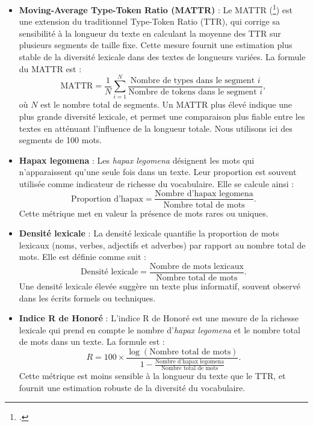 \documentclass[12pt,a4paper,oneside,titlepage]{book} %
\begin{document}
\begin{itemize}
\item \textbf{Moving-Average Type-Token Ratio (MATTR)} : Le MATTR (\footcite{covington2010cutting}) est une extension du traditionnel Type-Token Ratio (TTR), qui corrige sa sensibilité à la longueur du texte en calculant la moyenne des TTR sur plusieurs segments de taille fixe. Cette mesure fournit une estimation plus stable de la diversité lexicale dans des textes de longueurs variées. La formule du MATTR est :
\[
\text{MATTR} = \frac{1}{N} \sum_{i=1}^{N} \frac{\text{Nombre de types dans le segment } i}{\text{Nombre de tokens dans le segment } i},
\]
où \(N\) est le nombre total de segments. Un MATTR plus élevé indique une plus grande diversité lexicale, et permet une comparaison plus fiable entre les textes en atténuant l’influence de la longueur totale. Nous utilisons ici des segments de 100 mots.

\item \textbf{Hapax legomena} : Les \textit{hapax legomena} désignent les mots qui n’apparaissent qu’une seule fois dans un texte. Leur proportion est souvent utilisée comme indicateur de richesse du vocabulaire. Elle se calcule ainsi :
\[
\text{Proportion d’hapax} = \frac{\text{Nombre d’hapax legomena}}{\text{Nombre total de mots}}.
\]
Cette métrique met en valeur la présence de mots rares ou uniques.

\item \textbf{Densité lexicale} : La densité lexicale quantifie la proportion de mots lexicaux (noms, verbes, adjectifs et adverbes) par rapport au nombre total de mots. Elle est définie comme suit :
\[
\text{Densité lexicale} = \frac{\text{Nombre de mots lexicaux}}{\text{Nombre total de mots}}.
\]
Une densité lexicale élevée suggère un texte plus informatif, souvent observé dans les écrits formels ou techniques.

\item \textbf{Indice R de Honoré} : L’indice R de Honoré est une mesure de la richesse lexicale qui prend en compte le nombre d’\textit{hapax legomena }et le nombre total de mots dans un texte. La formule est :
\[
R = 100 \times \frac{\log(\text{Nombre total de mots})}{1 - \frac{\text{Nombre d’hapax legomena}}{\text{Nombre total de mots}}}.
\]
Cette métrique est moins sensible à la longueur du texte que le TTR, et fournit une estimation robuste de la diversité du vocabulaire.
\end{itemize}
\end{document}
